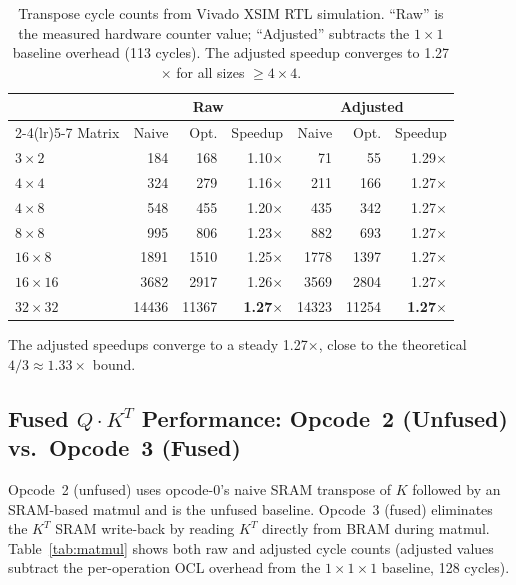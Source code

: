 \documentclass[11pt]{article}
\begin{document}
\begin{table}[h]
\centering
\begin{tabular}{@{}lrrrrrr@{}}
\toprule
 & \multicolumn{3}{c}{Raw} & \multicolumn{3}{c}{Adjusted} \\
\cmidrule(lr){2-4}\cmidrule(lr){5-7}
Matrix & Naive & Opt. & Speedup & Naive & Opt. & Speedup \\
\midrule
$3\times2$ & 184 & 168 & 1.10$\times$ & 71 & 55 & 1.29$\times$ \\
$4\times4$ & 324 & 279 & 1.16$\times$ & 211 & 166 & 1.27$\times$ \\
$4\times8$ & 548 & 455 & 1.20$\times$ & 435 & 342 & 1.27$\times$ \\
$8\times8$ & 995 & 806 & 1.23$\times$ & 882 & 693 & 1.27$\times$ \\
$16\times8$ & 1891 & 1510 & 1.25$\times$ & 1778 & 1397 & 1.27$\times$ \\
$16\times16$ & 3682 & 2917 & 1.26$\times$ & 3569 & 2804 & 1.27$\times$ \\
$32\times32$ & 14436 & 11367 & \textbf{1.27$\times$} & 14323 & 11254 & \textbf{1.27$\times$} \\
\bottomrule
\end{tabular}
\caption{Transpose cycle counts from Vivado XSIM RTL simulation. ``Raw'' is the
measured hardware counter value; ``Adjusted'' subtracts the $1\!\times\!1$
baseline overhead (113 cycles). The adjusted speedup converges to
1.27$\times$ for all sizes $\geq 4\!\times\!4$.}
\label{tab:transpose}
\end{table}

The adjusted speedups converge to a steady 1.27$\times$, close to the
theoretical $4/3 \approx 1.33\times$ bound.

\subsection{Fused $Q\!\cdot\!K^T$ Performance: Opcode~2 (Unfused) vs.\ Opcode~3 (Fused)}

Opcode~2 (unfused) uses opcode-0's naive SRAM transpose of $K$ followed by an SRAM-based matmul and is the unfused baseline. Opcode~3 (fused) eliminates the $K^T$ SRAM write-back by reading $K^T$ directly from BRAM during matmul. Table~\ref{tab:matmul} shows both raw and adjusted cycle counts (adjusted values subtract the per-operation OCL overhead from the $1\!\times\!1\!\times\!1$ baseline, 128 cycles).
\end{document}
